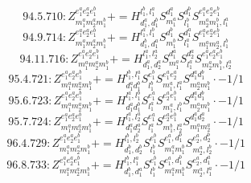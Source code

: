 \documentclass[letterpaper,10pt,fleqn,leqno,onecolumn]{article}
\begin{document}
\begin{equation} \;\;\;\;\;\;  94.5.710: Z^{e_{1}^{a}e_{2}^{a}e_{1}^{b}}_{m_{1}^{a}m_{2}^{a}m_{1}^{b}}+=H^{l_{1}^{b},l_{1}^{a}}_{d_{1}^{a},d_{1}^{b}}S^{d_{1}^{a}}_{m_{1}^{a}}S^{d_{1}^{b}}_{l_{1}^{b}}S^{e_{1}^{a}e_{2}^{a}e_{1}^{b}}_{m_{2}^{a}m_{1}^{b},l_{1}^{a}} \end{equation}
\begin{equation} \;\;\;\;\;\;  94.9.714: Z^{e_{1}^{a}e_{2}^{a}e_{1}^{b}}_{m_{1}^{a}m_{2}^{a}m_{1}^{b}}+=H^{l_{1}^{a},l_{1}^{b}}_{d_{1}^{b},d_{1}^{a}}S^{d_{1}^{b}}_{m_{1}^{b}}S^{d_{1}^{a}}_{l_{1}^{a}}S^{e_{1}^{a}e_{2}^{a}e_{1}^{b}}_{m_{1}^{a}m_{2}^{a},l_{1}^{b}} \end{equation}
\begin{equation} \;\;\;\;\;\;  94.11.716: Z^{e_{1}^{a}e_{2}^{a}e_{1}^{b}}_{m_{1}^{a}m_{2}^{a}m_{1}^{b}}+=H^{l_{1}^{a},l_{2}^{a}}_{d_{1}^{a},d_{2}^{a}}S^{d_{1}^{a}}_{m_{1}^{a}}S^{d_{2}^{a}}_{l_{1}^{a}}S^{e_{1}^{a}e_{2}^{a}e_{1}^{b}}_{m_{2}^{a}m_{1}^{b},l_{2}^{a}} \end{equation}
\begin{equation} \;\;\;\;\;\;  95.4.721: Z^{e_{1}^{a}e_{2}^{a}e_{1}^{b}}_{m_{1}^{a}m_{2}^{a}m_{1}^{b}}+=H^{l_{1}^{b},l_{1}^{a}}_{d_{1}^{a}d_{1}^{b}}S^{e_{1}^{b}}_{l_{1}^{b}}S^{e_{1}^{a}e_{2}^{a}}_{m_{1}^{a},l_{1}^{a}}S^{d_{1}^{a}d_{1}^{b}}_{m_{2}^{a}m_{1}^{b}}\cdot -1/1 \end{equation}
\begin{equation} \;\;\;\;\;\;  95.6.723: Z^{e_{1}^{a}e_{2}^{a}e_{1}^{b}}_{m_{1}^{a}m_{2}^{a}m_{1}^{b}}+=H^{l_{1}^{a},l_{1}^{b}}_{d_{1}^{a}d_{1}^{b}}S^{e_{1}^{a}}_{l_{1}^{a}}S^{e_{2}^{a}e_{1}^{b}}_{m_{1}^{a},l_{1}^{b}}S^{d_{1}^{a}d_{1}^{b}}_{m_{2}^{a}m_{1}^{b}}\cdot -1/1 \end{equation}
\begin{equation} \;\;\;\;\;\;  95.7.724: Z^{e_{1}^{a}e_{2}^{a}e_{1}^{b}}_{m_{1}^{a}m_{2}^{a}m_{1}^{b}}+=H^{l_{1}^{a},l_{2}^{a}}_{d_{1}^{a}d_{2}^{a}}S^{e_{1}^{a}}_{l_{1}^{a}}S^{e_{2}^{a}e_{1}^{b}}_{m_{1}^{b},l_{2}^{a}}S^{d_{1}^{a}d_{2}^{a}}_{m_{1}^{a}m_{2}^{a}}\cdot -1/1 \end{equation}
\begin{equation} \;\;\;\;\;\;  96.4.729: Z^{e_{1}^{a}e_{2}^{a}e_{1}^{b}}_{m_{1}^{a}m_{2}^{a}m_{1}^{b}}+=H^{l_{1}^{b},l_{2}^{b}}_{d_{1}^{b},d_{2}^{b}}S^{e_{1}^{b}}_{l_{1}^{b}}S^{e_{1}^{a},d_{1}^{b}}_{m_{1}^{a}m_{1}^{b}}S^{e_{2}^{a},d_{2}^{b}}_{m_{2}^{a},l_{2}^{b}}\cdot -1/1 \end{equation}
\begin{equation} \;\;\;\;\;\;  96.8.733: Z^{e_{1}^{a}e_{2}^{a}e_{1}^{b}}_{m_{1}^{a}m_{2}^{a}m_{1}^{b}}+=H^{l_{1}^{b},l_{1}^{a}}_{d_{1}^{b},d_{1}^{a}}S^{e_{1}^{b}}_{l_{1}^{b}}S^{e_{1}^{a},d_{1}^{b}}_{m_{1}^{a}m_{1}^{b}}S^{e_{2}^{a},d_{1}^{a}}_{m_{2}^{a},l_{1}^{a}}\cdot -1/1 \end{equation}
\end{document}
